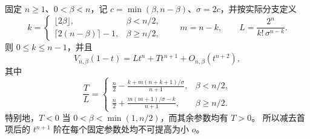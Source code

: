 \begin{theorem}[次首项系数及其临界取值]\label{hd:second-coefficient}
固定 $n\ge1$、$0<\beta<n$，记 $c=\min(\beta,n-\beta)$、$\sigma=2c$，并按实际分支定义
\[
 k=\begin{cases}\lfloor2\beta\rfloor,&\beta<n/2,\\
 \lceil2(n-\beta)\rceil-1,&\beta\ge n/2,
 \end{cases}\qquad m=n-k,\qquad L=\frac{2^n}{k!\,\sigma^{n-k}}.
\]
则 $0\le k\le n-1$，并且
\begin{equation}\label{hd:second-expansion}
 V_{n,\beta}(1-t)=Lt^n+Tt^{n+1}+O_{n,\beta}(t^{n+2}),
\end{equation}
其中
\begin{equation}\label{hd:second-formula}
 \frac TL=\begin{cases}
 \displaystyle\frac n2-\frac{k+m(n+k+1)/\sigma}{n+1},&\beta<n/2,\\[6pt]
 \displaystyle\frac n2+\frac{m(m+1)/\sigma-k}{n+1},&\beta\ge n/2.
 \end{cases}
\end{equation}
特别地，$T<0$ 当 $0<\beta<\min(1,n/2)$，而其余参数均有 $T>0$。
所以减去首项后的 $t^{n+1}$ 阶在每个固定参数处均不可提高为小 $o$。
\end{theorem}
